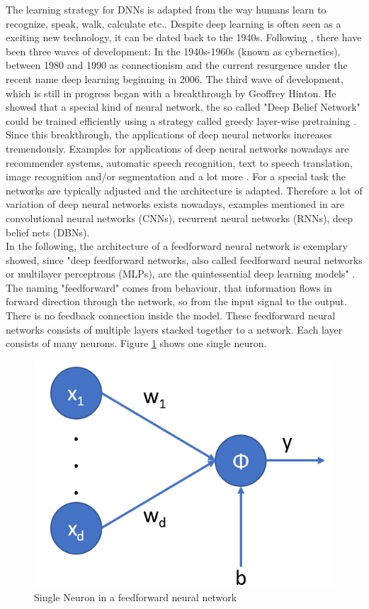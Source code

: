 \documentclass[12pt,DIV14,BCOR12mm,a4paper,footexclude,headinclude,halfparskip-,twoside,openright,cleardoubleempty,idxtotoc,bibtotoc,listtotoc]{scrreprt} %
\numberwithin{equation}{chapter}
\begin{document}
The learning strategy for DNNs is adapted from the way humans learn to recognize, speak, walk, calculate etc.. Despite deep learning is often seen as a exciting new technology, it can be dated back to the 1940s. Following \cite{Goodfellow-et-al-2016}, there have been three waves of development: In the 1940s-1960s (known as cybernetics), between 1980 and 1990 as connectionism and the current resurgence under the recent name deep learning beginning in 2006. The third wave of development, which is still in progress began with a breakthrough by Geoffrey Hinton. He showed that a special kind of neural network, the so called "Deep Belief Network" could be trained efficiently using a strategy called greedy layer-wise pretraining \cite{Hinton-et-al-2006}.\\
Since this breakthrough, the applications of deep neural networks increases tremendously. Examples for applications of deep neural networks nowadays are recommender systems, automatic speech recognition, text to speech translation, image recognition and/or segmentation and a lot more \cite{DeepLearningDive}. For a special task the networks are typically adjusted and the architecture is adapted. Therefore a lot of variation of deep neural networks exists nowadays, examples mentioned in \cite{Nielsen-Michael} are convolutional neural networks (CNNs), recurrent neural networks (RNNs), deep belief nets (DBNs).\\
In the following, the architecture of a feedforward neural network is exemplary showed, since "deep feedforward networks, also called feedforward neural networks or multilayer perceptrons (MLPs), are the quintessential deep learning models" \cite{Goodfellow-et-al-2016}. The naming "feedforward" comes from behaviour, that information flows in forward direction through the network, so from the input signal to the output. There is no feedback connection inside the model. These feedforward neural networks consists of multiple layers stacked together to a network. Each layer consists of many neurons. Figure \ref{fig:SingleNeuron} shows one single neuron.
\begin{figure}[htb!]
	\centering
	\includegraphics[width=0.3\linewidth]{Graphiken/SingleNeuron}
	\caption{Single Neuron in a feedforward neural network}
	\label{fig:SingleNeuron}
\end{figure}
\end{document}
